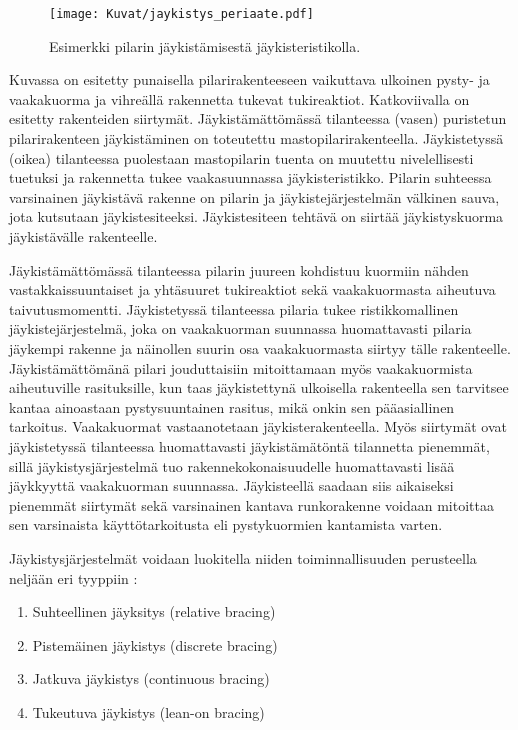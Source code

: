 \documentclass[12pt]{article}
\newenvironment{content}{\pagenumbering{arabic}}{}
\begin{document}
\begin{content}
\begin{figure}[htb]
\centering
\texttt{[image: Kuvat/jaykistys\_periaate.pdf]}
\caption{Esimerkki pilarin jäykistämisestä jäykisteristikolla.}
\label{fig:jaykistys_periaate}
\end{figure}

Kuvassa on esitetty punaisella pilarirakenteeseen vaikuttava ulkoinen pysty- ja vaakakuorma ja vihreällä rakennetta tukevat tukireaktiot. Katkoviivalla on esitetty rakenteiden siirtymät. Jäykistämättömässä tilanteessa (vasen) puristetun pilarirakenteen jäykistäminen on toteutettu mastopilarirakenteella. Jäykistetyssä (oikea) tilanteessa puolestaan mastopilarin tuenta on muutettu nivelellisesti tuetuksi ja rakennetta tukee vaakasuunnassa jäykisteristikko. Pilarin suhteessa varsinainen jäykistävä rakenne on pilarin ja jäykistejärjestelmän välkinen sauva, jota kutsutaan jäykistesiteeksi. Jäykistesiteen tehtävä on siirtää jäykistyskuorma jäykistävälle rakenteelle. 

Jäykistämättömässä tilanteessa pilarin juureen kohdistuu kuormiin nähden vastakkaissuuntaiset ja yhtäsuuret tukireaktiot sekä vaakakuormasta aiheutuva taivutusmomentti. Jäykistetyssä tilanteessa pilaria tukee ristikkomallinen jäykistejärjestelmä, joka on vaakakuorman suunnassa huomattavasti pilaria jäykempi rakenne ja näinollen suurin osa vaakakuormasta siirtyy tälle rakenteelle. Jäykistämättömänä pilari jouduttaisiin mitoittamaan myös vaakakuormista aiheutuville rasituksille, kun taas jäykistettynä ulkoisella rakenteella sen tarvitsee kantaa ainoastaan pystysuuntainen rasitus, mikä onkin sen pääasiallinen tarkoitus. Vaakakuormat vastaanotetaan jäykisterakenteella. Myös siirtymät ovat jäykistetyssä tilanteessa huomattavasti jäykistämätöntä tilannetta pienemmät, sillä jäykistysjärjestelmä tuo rakennekokonaisuudelle huomattavasti lisää jäykkyyttä vaakakuorman suunnassa. Jäykisteellä saadaan siis aikaiseksi pienemmät siirtymät sekä varsinainen kantava runkorakenne voidaan mitoittaa sen varsinaista käyttötarkoitusta eli pystykuormien kantamista varten.
 
Jäykistysjärjestelmät voidaan luokitella niiden toiminnallisuuden perusteella neljään eri tyyppiin \parencite{yura}:

\begin{enumerate}
\item Suhteellinen jäyksitys (relative bracing)
\item Pistemäinen jäykistys (discrete bracing)
\item Jatkuva jäykistys (continuous bracing)
\item Tukeutuva jäykistys (lean-on bracing)
\end{enumerate}


\end{content}
\end{document}
